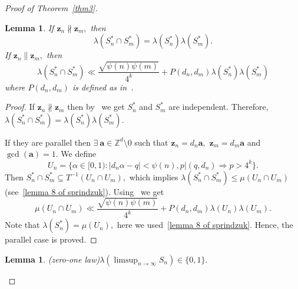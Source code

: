 \documentclass[12pt,article]{amsart}
\newtheorem{lemma}[theorem]{Lemma}
\theoremstyle{remark}
\numberwithin{equation}{section}
\newcommand{\Z}{\mathbb{Z}}
\newcommand{\boldz}{\boldsymbol{z}}
\newcommand{\bolda}{\boldsymbol{a}}
\begin{document}
\begin{proof}[Proof of Theorem~\ref{thm3}]
\begin{lemma}
			If $\boldz_n\nparallel \boldz_m,$ then
			$$\lambda(S^{*}_n\cap S^{*}_m)=\lambda(S^{*}_n)\lambda(S^{*}_m).$$
			If $\boldz_n\parallel\boldz_m,$ then
			$$\lambda(S^{*}_n\cap S^{*}_m)\ll\frac{\sqrt{\psi(n)\psi(m)}}{4^k}+P(d_n,d_m)\lambda(S^{*}_n)\lambda(S^{*}_m)$$
			where $P(d_n,d_m)$ is defined as in~\cite[Lemma 3]{Aistleitner2021minimalgap}.
		\end{lemma}
		\begin{proof}
			If $\boldz_n\nparallel \boldz_m$ then by~\cite[Lemma 1]{remirez} we get $S^{*}_n$ and $S^{*}_m$ are independent. Therefore, $\lambda(S^{*}_n\cap S^{*}_m)=\lambda(S^{*}_n)\lambda(S^{*}_m).$
			
			
			If they are parallel then $\exists\: \bolda\in\Z^d\setminus 0$ such that $\boldz_n=d_n\bolda,$ $\boldz_m=d_m\bolda$ and $\gcd(\bolda)=1.$ We define
			\[U_n=\{\alpha\in[0,1): |d_n\alpha-q|<\psi(n), p|(q,d_n)\Rightarrow p>4^k\}.\] 
			Then $S^{*}_n\cap S^{*}_m\subseteq T^{-1}(U_n\cap U_m),$ which implies $\lambda(S^{*}_n\cap S^{*}_m)\leq\mu(U_n\cap U_m)$ (see~\eqref{lemma 8 of sprindzuk}). Using~\cite[Lemma 3]{Aistleitner2021minimalgap} we get
			\[\mu(U_n\cap U_m)\ll\frac{\sqrt{\psi(n)\psi(m)}}{4^k}+P(d_n,d_m)\lambda(U_n)\lambda(U_m).\]
			Note that $\lambda(S^{*}_n)=\mu(U_n),$ here we used~\eqref{lemma 8 of sprindzuk}. Hence, the parallel case is proved.
		\end{proof}
		\begin{lemma}(zero-one law)\cite[Theorem 1]{victor-samju2008}\label{zero one law}
			$\lambda(\limsup_{n\to\infty}S_n)\in\{0,1\}.$
		\end{lemma}
		

\end{proof}
\end{document}
